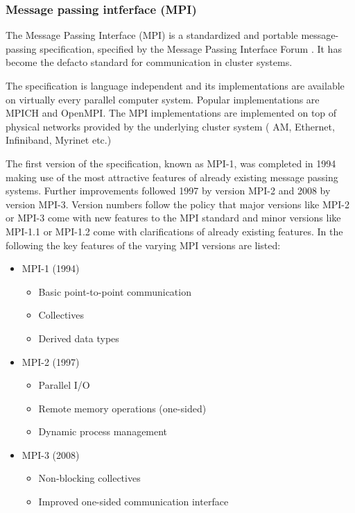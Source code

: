 \subsubsection{Message passing intferface (MPI)}
\label{sec:mpi}
The Message Passing Interface (MPI) is a standardized and portable
message-passing specification, specified by the Message Passing
Interface Forum \cite{ref:mpi_specification}. It has become the
defacto standard for communication in cluster systems.

The specification is language independent and its implementations are
available on virtually every parallel computer system.  Popular
implementations are MPICH and OpenMPI.  The MPI implementations are
implemented on top of physical networks provided by the underlying
cluster system ( AM, Ethernet, Infiniband, Myrinet etc.)

The first version of the specification, known as MPI-1, was completed
in 1994 making use of the most attractive features of already
existing message passing systems.  Further improvements followed 1997
by version MPI-2 and 2008 by version MPI-3. Version numbers follow
the policy that major versions like MPI-2 or MPI-3 come with new
features to the MPI standard and minor versions like MPI-1.1 or
MPI-1.2 come with clarifications of already existing features. In
the following the key features of the varying MPI versions are listed:

\begin{itemize}
  \item MPI-1 (1994)
    \begin{itemize}
      \item Basic point-to-point communication
      \item Collectives
      \item Derived data types
    \end{itemize}
  \item MPI-2 (1997)
    \begin{itemize}
      \item Parallel I/O
      \item Remote memory operations (one-sided)
      \item Dynamic process management
    \end{itemize}
  \item MPI-3 (2008)
    \begin{itemize}
      \item Non-blocking collectives
      \item Improved one-sided communication interface
    \end{itemize}
\end{itemize}

